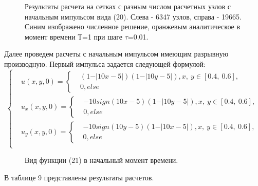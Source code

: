 \documentclass[14pt]{article}
\begin{document}
\newpage
\begin{figure}[!h!]
\caption{Результаты расчета на сетках с разным числом расчетных узлов с начальным импульсом вида (20). Слева - 6347 узлов, справа - 19665. Синим изображено численное решение, оранжевым аналитическое в момент времени Т=1 при шаге $\tau$=0.01.}
\end{figure}
Далее проведем расчеты с начальным импульсом имеющим разрывную производную. Первый импульса задается следующей формулой:
\begin{equation}
\left\lbrace
\begin{aligned}
&u(x,y,0) = \left\lbrace \begin{aligned}
&(1 - \vert 10x - 5 \vert)(1- \vert 10y - 5\vert), x,\:y \in [0.4,\:0.6],\\
&0, else
\end{aligned}
\right . \\
&u_x(x,y,0) = \left\lbrace \begin{aligned}
&-10 sign(10x-5)(1- \vert 10y - 5\vert), x,\:y \in [0.4,\:0.6],\\
&0, else
\end{aligned}
\right . \\
&u_y(x,y,0) =  \left\lbrace \begin{aligned}
&-10 sign(10y-5)(1- \vert 10x - 5\vert), x,\:y \in [0.4,\:0.6],\\
&0, else
\end{aligned}
\right . \\
\end{aligned}
\right .
\end{equation}
\begin{figure}[!h!]
\caption{Вид функции (21) в начальный момент времени.}
\end{figure}
В таблице 9 представлены результаты расчетов.
\end{document}
